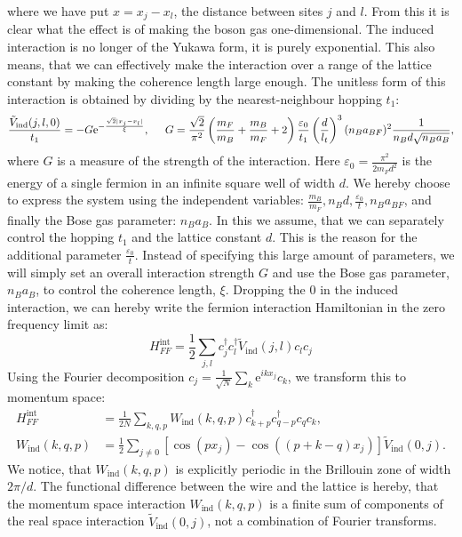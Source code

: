 where we have put $x = x_j - x_l$, the distance between sites $j$ and $l$. From this it is clear what the effect is of making the boson gas one-dimensional. The induced interaction is no longer of the Yukawa form, it is purely exponential. This also means, that we can effectively make the interaction over a range of the lattice constant by making the coherence length large enough. The unitless form of this interaction is obtained by dividing by the nearest-neighbour hopping $t_1$:
\begin{equation}
\frac{\tilde{V}_{\text{ind}}(j, l, 0)}{t_1} = -G \text{e}^{-\frac{\sqrt{2}|x_j - x_l|}{\xi}}, \hspace{0.5cm} G = \frac{\sqrt{2}}{\pi^2} \left(\frac{m_F}{m_B} + \frac{m_B}{m_F} + 2\right)\frac{\varepsilon_0}{t_1}\left(\frac{d}{l_t}\right)^3 (n_Ba_{BF})^2 \frac{1}{n_Bd\sqrt{n_Ba_B}},
\label{eq.Inducedcinteractionrealspaceunitless.kitaevchain} 
\end{equation}
where $G$ is a measure of the strength of the interaction. Here $\varepsilon_0 = \frac{\pi^2}{2m_Fd^2}$ is the energy of a single fermion in an infinite square well of width $d$. We hereby choose to express the system using the independent variables: $\frac{m_B}{m_F}, n_Bd, \frac{\varepsilon_0}{t}, n_B a_{BF}$, and finally the Bose gas parameter: $n_B a_{B}$. In this we assume, that we can separately control the hopping $t_1$ and the lattice constant $d$. This is the reason for the additional parameter $\frac{\varepsilon_0}{t}$. Instead of specifying this large amount of parameters, we will simply set an overall interaction strength $G$ and use the Bose gas parameter, $n_B a_{B}$, to control the coherence length, $\xi$. Dropping the $0$ in the induced interaction, we can hereby write the fermion interaction Hamiltonian in the zero frequency limit as:
\begin{equation}
H^{\text{int}}_{FF} = \frac{1}{2}\sum_{j,l} c^\dagger_j c^\dagger_l \tilde{V}_{\text{ind}}(j, l) c_l c_j
\label{eq.Hintrealspace.lattice}
\end{equation}
Using the Fourier decomposition $c_j = \frac{1}{\sqrt{N}}\sum_k \text{e}^{ikx_j}c_k$, we transform this to momentum space:
\begin{align}
H^{\text{int}}_{FF} &= \frac{1}{2N} \sum_{k, q, p} W_{\text{ind}}(k, q, p) c^\dagger_{k + p} c^\dagger_{q - p} c_q c_k, \nonumber \\  
W_{\text{ind}}(k, q, p) &= \frac{1}{2}\sum_{j\neq 0} \left[\cos(px_j) - \cos((p + k - q)x_j) \right]\tilde{V}_{\text{ind}}(0, j). 
\label{eq.Hintmomentumspace.lattice}
\end{align}
We notice, that $W_{\text{ind}}(k, q, p)$ is explicitly periodic in the Brillouin zone of width $2\pi / d$. The functional difference between the wire and the lattice is hereby, that the momentum space interaction $W_{\text{ind}}(k, q, p)$ is a finite sum of components of the real space interaction $\tilde{V}_{\text{ind}}(0, j)$, not a combination of Fourier transforms. 


